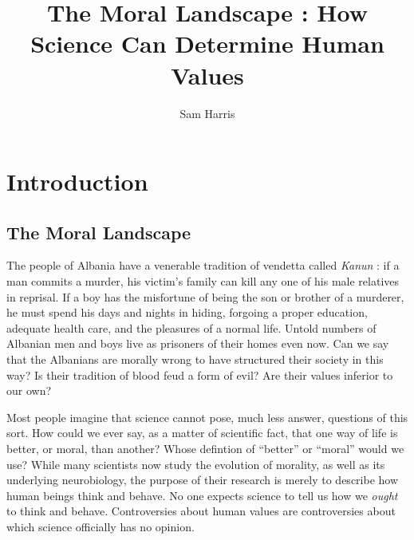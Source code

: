 \documentclass[a4paper,12pt]{extbook}
\title{The Moral Landscape : How Science Can Determine Human Values}
\author{Sam Harris}
\begin{document}
\maketitle
\tableofcontents

\newpage
\section{Introduction}

\subsection{The Moral Landscape}

The people of Albania have a venerable tradition of vendetta called \textit{Kanun} :
if a man commits a murder, his victim's family can kill any one of his male relatives in reprisal.
If a boy has the misfortune of being the son or brother of a murderer, he must spend his days and nights in hiding, forgoing a proper education, adequate health care, and the pleasures of a normal life.
Untold numbers of Albanian men and boys live as prisoners of their homes even now.
Can we say that the Albanians are morally wrong to have structured their society in this way?
Is their tradition of blood feud a form of evil?
Are their values inferior to our own?

Most people imagine that science cannot pose, much less answer, questions of this sort.
How could we ever say, as a matter of scientific fact, that one way of life is better, or moral, than another?
Whose defintion of ``better'' or ``moral'' would we use?
While many scientists now study the evolution of morality, as well as its underlying neurobiology, the purpose of their research is merely to describe how human beings think and behave.
No one expects science to tell us how we \textit{ought} to think and behave.
Controversies about human values are controversies about which science officially has no opinion.
\end{document}
